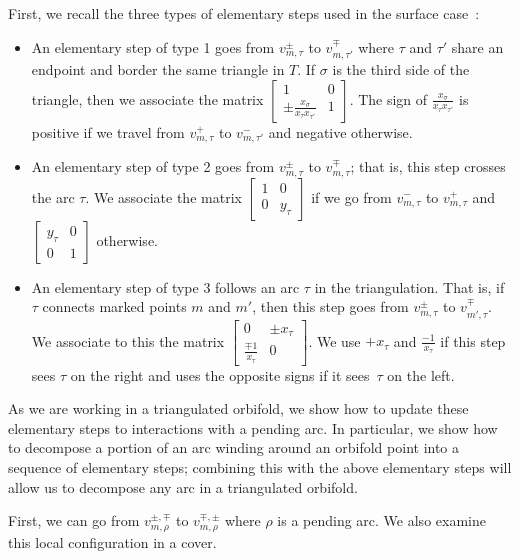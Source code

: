 \documentclass[pdftex]{sigma}%
\numberwithin{equation}{section}
\begin{document}
First, we recall the three types of elementary steps used in the surface case~\cite{MW}:
\begin{itemize}\itemsep=0pt
 \item An elementary step of type 1 goes from $v^\pm_{m,\tau}$ to $v^\mp_{m,\tau'}$ where $\tau$ and $\tau'$ share an endpoint and border the same triangle in $T$. If $\sigma$ is the third side of the triangle, then we associate the matrix $\left[\begin{smallmatrix} 1 & 0 \\ \pm \frac{x_{\sigma}}{x_\tau x_{\tau'}} & 1 \end{smallmatrix}\right]$. The sign of $\frac{x_{\sigma}}{x_\tau x_{\tau'}}$ is positive if we travel from $v^+_{m,\tau}$ to $v^-_{m,\tau'}$ and negative otherwise.
 \item An elementary step of type 2 goes from $v^\pm_{m,\tau}$ to $v^\mp_{m,\tau}$; that is, this step crosses the arc $\tau$. We associate the matrix $\left[\begin{smallmatrix} 1 & 0 \\ 0 & y_\tau \end{smallmatrix}\right]$ if we go from $v^-_{m,\tau}$ to $v^+_{m,\tau}$ and $\left[\begin{smallmatrix} y_\tau & 0 \\ 0 & 1 \end{smallmatrix}\right]$ otherwise.
 \item An elementary step of type 3 follows an arc $\tau$ in the triangulation. That is, if $\tau$ connects marked points $m$ and $m'$, then this step goes from $v^\pm_{m, \tau}$ to $v^\mp_{m',\tau}$. We associate to this the matrix $\left[\begin{smallmatrix} 0 & \pm x_\tau \\ \frac{\mp 1}{x_\tau} & 0 \end{smallmatrix}\right]$. We use $+ x_\tau$ and $\frac{-1}{x_\tau}$ if this step sees $\tau$ on the right and uses the opposite signs if it sees~$\tau$ on the left.
\end{itemize}

As we are working in a triangulated orbifold, we show how to update these elementary steps to interactions with a pending arc. In particular, we show how to decompose a portion of an arc winding around an orbifold point into a sequence of elementary steps; combining this with the above elementary steps will allow us to decompose any arc in a triangulated orbifold.

First, we can go from $v^{\pm,\mp}_{m,\rho}$ to $v^{\mp,\pm}_{m,\rho}$ where $\rho$ is a pending arc. We also examine this local configuration in a cover.
\end{document}
